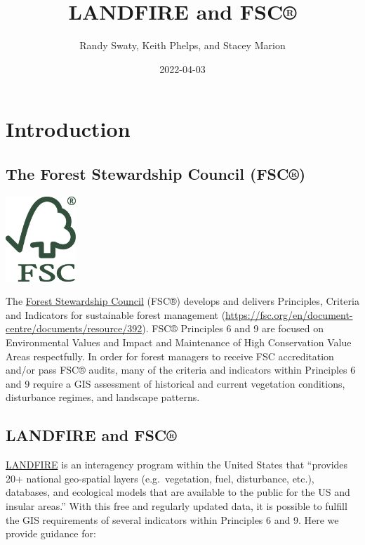 \documentclass[
]{book}
\title{LANDFIRE and FSC®}
\author{Randy Swaty, Keith Phelps, and Stacey Marion}
\date{2022-04-03}
\begin{document}
\maketitle

{
\setcounter{tocdepth}{1}
\tableofcontents
}
\hypertarget{Introduction}{%
\chapter{Introduction}\label{Introduction}}

\hypertarget{the-forest-stewardship-council-fsc}{%
\section{The Forest Stewardship Council (FSC®)}\label{the-forest-stewardship-council-fsc}}

\includegraphics[width=100px]{KP_screenshots/FSC_Logo}

The \href{https://fsc.org/en}{Forest Stewardship Council} (FSC®) develops and delivers Principles, Criteria and Indicators for sustainable forest management (\url{https://fsc.org/en/document-centre/documents/resource/392}). FSC® Principles 6 and 9 are focused on Environmental Values and Impact and Maintenance of High Conservation Value Areas respectfully. In order for forest managers to receive FSC accreditation and/or pass FSC® audits, many of the criteria and indicators within Principles 6 and 9 require a GIS assessment of historical and current vegetation conditions, disturbance regimes, and landscape patterns.

\hypertarget{landfire-and-fsc}{%
\section{LANDFIRE and FSC®}\label{landfire-and-fsc}}

\href{https://landfire.gov/}{LANDFIRE} is an interagency program within the United States that ``provides 20+ national geo-spatial layers (e.g.~vegetation, fuel, disturbance, etc.), databases, and ecological models that are available to the public for the US and insular areas.'' With this free and regularly updated data, it is possible to fulfill the GIS requirements of several indicators within Principles 6 and 9. Here we provide guidance for:
\end{document}
